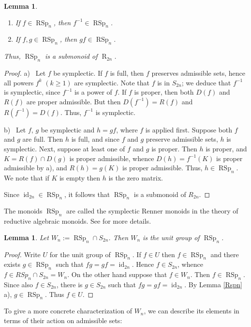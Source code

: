 \documentclass[11pt]{article}
\newtheorem{lemma}[theorem]{Lemma}
\newcommand{\ges}{\geqslant}
\DeclareMathOperator{\id}{id}
\DeclareMathOperator{\RSp}{RSp}
\DeclareMathOperator{\R}{R}
\begin{document}
  \vspace{2mm}
\begin{lemma}{\label{Rspn}}
\begin{enumerate}[\upshape a)]
  \item If $f\in \RSp_n$, then $f^{-1}\in \RSp_n$.
  \vspace{-2mm}
  \item If 
   $f,g\in \RSp_n$, then $gf\in \RSp_n$. 
   \end{enumerate}
\noindent
Thus, $\RSp_n$ is a submonoid of $\R_{2n}$.
\end{lemma}
\begin{proof} 
 a)~ Let $f$ be symplectic. If $f$ is full, then $f$ preserves admissible sets, hence all powers $f^k$ $( k\ges 1)$ are symplectic. Note that $f$ is in $S_{2n}$; we deduce that $f^{-1}$ is symplectic, since $f^{-1}$ is a power of $f$.
 If $f$ is proper, then both $D(f)$ and $R(f)$ are proper admissible. But then $D(f^{-1})=R(f)$ and
 $R(f^{-1})=D(f)$. Thus, $f^{-1}$ is symplectic.
  
b)~ Let $f$, $g$ be symplectic and $h=gf$, where $f$ is applied first. Suppose both $f$ and $ g$  are full. Then $h$ is full, and since $f$ and $g$ preserve admissible sets, $h$ is symplectic. Next, suppose at least one of $f$ and $g$ is proper. Then $h$ is proper, and
 $K=R(f)\cap D(g)$ is proper admissible, whence $D(h)=f^{-1}(K)$ is proper admissible by a), and $R(h)=g(K)$ is proper admissible. Thus, $h\in \RSp_n$. We note that if $K$ is empty then
 $h$ is the zero matrix.
 
Since $\id_{2n}\in \RSp_n$, it follows that $\RSp_n$ is a submonoid of $R_{2n}$.
\end{proof} 
The monoids $\RSp_n$ are called the symplectic Renner monoids in the theory of reductive algebraic monoids. See \cite{CLSW, LLC, ZHL, ZL} for more details. 
\begin{lemma} Let
  $W_n:=\RSp_n\cap S_{2n}$. Then $W_n$ is the unit group of $\RSp_n$. 
\end{lemma}
\begin{proof} 
Write $U$ for the unit group of $\RSp_n$. 
If $f\in U$ then $f\in \RSp_n$ and there exists $g\in \RSp_n$ such that $fg=gf=\id_{2n}$. Hence $f\in S_{2n}$, whence $f\in RSp_n\cap S_{2n}= W_n$.
On the other hand suppose that $f\in W_n$. Then $f\in \RSp_n$. Since also $f\in S_{2n}$,  there is $g\in S_{2n}$
  such that $fg=gf=\id_{2n}$. By  Lemma \ref{Rspn} a), $g\in \RSp_n$. Thus $f\in  U$. 
\end{proof}
To give a more concrete characterization of $W_n$, we can describe its elements in terms of their action on admissible sets: 
\end{document}
